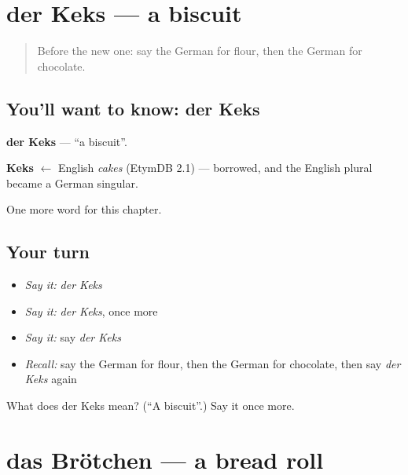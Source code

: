 \section[der Keks]{der Keks — a biscuit}

\label{lesson:GE-C122-keks}



\begin{quote}
Before the new one: say the German for flour, then the German for chocolate.
\end{quote}

\subsection*{You'll want to know: der Keks}
\textbf{der Keks} — \textquotedblleft{}a biscuit\textquotedblright{}.

\begin{cousinweb}
\textbf{Keks} $\leftarrow$ English \emph{cakes} (EtymDB 2.1) — borrowed, and the English plural became a German singular.
\end{cousinweb}

\begin{grammarlens}[title={What you've built}]
One more word for this chapter.
\end{grammarlens}

\subsection*{Your turn}
\begin{itemize}
\raggedright
  \item \emph{Say it:} \emph{der Keks}
  \item \emph{Say it:} \emph{der Keks}, once more
  \item \emph{Say it:} say \emph{der Keks}
  \item \emph{Recall:} say the German for flour, then the German for chocolate, then say \emph{der Keks} again
\end{itemize}

\begin{tcolorbox}[breakable,colback=teal!4,colframe=teal!35!black,title={Before you move on}]
What does der Keks mean? (\textquotedblleft{}A biscuit\textquotedblright{}.) Say it once more.
\end{tcolorbox}
\section[das Brötchen]{das Brötchen — a bread roll}

